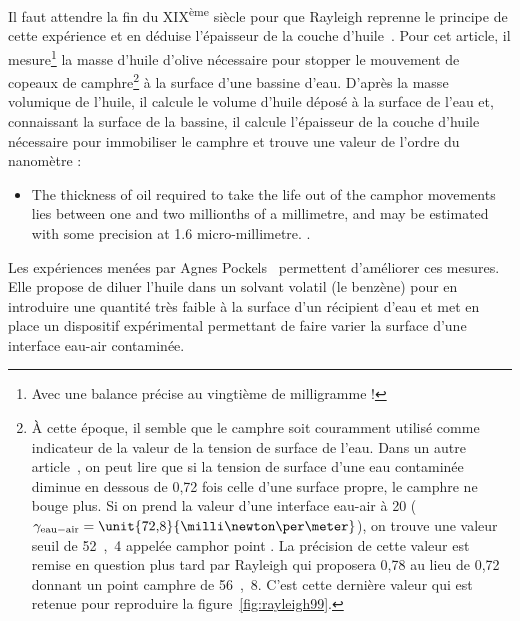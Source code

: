 \documentclass[12pt,a4paper]{article}
\begin{document}
Il faut attendre la fin du XIX\textsuperscript{ème} siècle pour que Rayleigh reprenne le principe de cette expérience et en déduise l'épaisseur de la couche d'huile~\cite{Rayleigh1890a}.
Pour cet article, il mesure\footnote{Avec une balance précise au vingtième de milligramme !} la masse d'huile d'olive nécessaire pour stopper le mouvement de copeaux de camphre\footnote{À cette époque, il semble que le camphre soit couramment utilisé comme indicateur de la valeur de la tension de surface de l'eau.
Dans un autre article~\cite{Rayleigh1892}, on peut lire que si la tension de surface d'une eau contaminée diminue en dessous de 0{,}72 fois celle d'une surface propre, le camphre ne bouge plus.
Si on prend la valeur d'une interface eau-air à \unit{20}{\celsius} ($\gamma_\mathrm{eau-air}=\unit{72{,}8}{\milli\newton\per\meter}$), on trouve une valeur seuil de \unit{52{,}4}{\milli\newton\per\meter} appelée \og camphor point \fg{} .
La précision de cette valeur est remise en question plus tard par Rayleigh qui proposera \cite{Rayleigh1899} 0{,}78 au lieu de 0{,}72 donnant un point camphre de \unit{56{,}8}{\milli\newton\per\meter}.
C'est cette dernière valeur qui est retenue pour reproduire la figure~\ref{fig:rayleigh99}.} à la surface d'une bassine d'eau.
D'après la masse volumique de l'huile, il calcule le volume d'huile déposé à la surface de l'eau et, connaissant la surface de la bassine, il calcule l'épaisseur de la couche d'huile nécessaire pour immobiliser le camphre et trouve une valeur de l'ordre du nanomètre :
\begin{itemize}
\item[]
\og
The thickness of oil required to take the life out of the camphor movements lies between one and two millionths of a millimetre, and may be estimated with some precision at 1{.}6 micro-millimetre.
\fg{}.
\end{itemize}

Les expériences menées par Agnes Pockels~\cite{Pockels1891, Pockels1894} permettent d'améliorer ces mesures.
Elle propose de diluer l'huile dans un solvant volatil (le benzène) pour en introduire une quantité très faible à la surface d'un récipient d'eau et met en place un dispositif expérimental permettant de faire varier la surface d'une interface eau-air contaminée.
\end{document}
